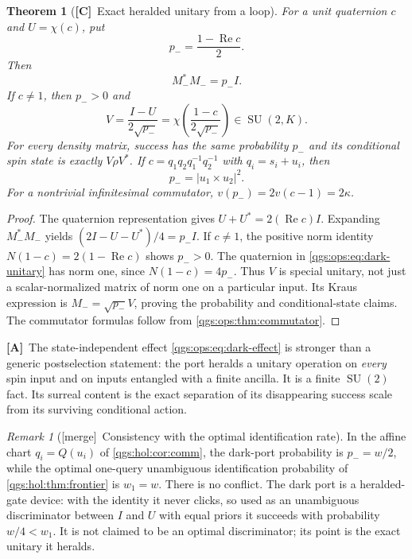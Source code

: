 \documentclass[11pt,oneside]{article}
\numberwithin{equation}{section}
\theoremstyle{plain}
\newtheorem{theorem}{Theorem}[section]
\theoremstyle{definition}
\theoremstyle{remark}
\newtheorem{remark}[remark]{Remark}
\DeclareMathOperator{\Rea}{Re}
\DeclareMathOperator{\SU}{SU}
\newcommand{\abs}[1]{\left|#1\right|}
\newcommand{\TC}{\textcolor{TierC}{\textsf{\bfseries[C]}}}
\newcommand{\TA}{\textcolor{TierA}{\textsf{\bfseries[A]}}}
\newcommand{\merge}{{\small\textsf{[merge]}}}
\begin{document}
\begin{theorem}[\TC\ Exact heralded unitary from a loop]\label{qgs:ops:thm:dark}
For a unit quaternion $c$ and $U=\chi(c)$, put
\begin{equation}\label{qgs:ops:eq:dark-prob}
 p_- =\frac{1-\Rea c}{2}.
\end{equation}
Then
\begin{equation}\label{qgs:ops:eq:dark-effect}
 M_-^*M_-=p_-I.
\end{equation}
If $c\ne1$, then $p_->0$ and
\begin{equation}\label{qgs:ops:eq:dark-unitary}
 V=\frac{I-U}{2\sqrt{p_-}}
   =\chi\!\left(\frac{1-c}{2\sqrt{p_-}}\right)\in\SU(2,K).
\end{equation}
For every density matrix, success has the same probability $p_-$ and its conditional spin state is exactly $V\rho V^*$. If $c=q_1q_2q_1^{-1}q_2^{-1}$ with $q_i=s_i+u_i$, then
\begin{equation}\label{qgs:ops:eq:dark-cross}
 p_-=\abs{u_1\times u_2}^2.
\end{equation}
For a nontrivial infinitesimal commutator, $v(p_-)=2v(c-1)=2\kappa$.
\end{theorem}
\begin{proof}
The quaternion representation gives $U+U^*=2(\Rea c)I$. Expanding $M_-^*M_-$ yields $(2I-U-U^*)/4=p_-I$. If $c\ne1$, the positive norm identity $N(1-c)=2(1-\Rea c)$ shows $p_->0$. The quaternion in \eqref{qgs:ops:eq:dark-unitary} has norm one, since $N(1-c)=4p_-$. Thus $V$ is special unitary, not just a scalar-normalized matrix of norm one on a particular input. Its Kraus expression is $M_-=\sqrt{p_-}V$, proving the probability and conditional-state claims. The commutator formulas follow from \cref{qgs:ops:thm:commutator}.
\end{proof}

\TA\ The state-independent effect \eqref{qgs:ops:eq:dark-effect} is stronger than a generic postselection statement: the port heralds a unitary operation on \emph{every} spin input and on inputs entangled with a finite ancilla. It is a finite $\SU(2)$ fact. Its surreal content is the exact separation of its disappearing success scale from its surviving conditional action.

\begin{remark}[\merge\ Consistency with the optimal identification rate]\label{qgs:mrg:rem:darkrate}
In the affine chart $q_i=Q(u_i)$ of \cref{qgs:hol:cor:comm}, the dark-port probability is $p_-=w/2$, while the optimal one-query unambiguous identification probability of \cref{qgs:hol:thm:frontier} is $w_1=w$. There is no conflict. The dark port is a heralded-gate device: with the identity it never clicks, so used as an unambiguous discriminator between $I$ and $U$ with equal priors it succeeds with probability $w/4<w_1$. It is not claimed to be an optimal discriminator; its point is the exact unitary it heralds.
\end{remark}
\end{document}
